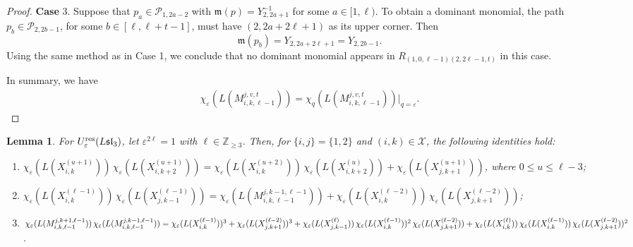 \documentclass[11pt, reqno]{amsart}
\theoremstyle{plain}
\newtheorem{lemma}[theorem]{Lemma}
\theoremstyle{definition}
\numberwithin{equation}{section}
\newcommand{\res}{{\rm res}}
\begin{document}
\begin{proof}
{\bf Case} 3. Suppose that $p_a\in \mathscr{P}_{1,2a-2}$ with $\mathfrak{m}(p)=Y^{-1}_{2,2a+1}$ for some $a\in[1, \ell)$. To obtain a dominant monomial, the path $p_b\in \mathscr{P}_{2,2b-1}$, for some $b\in[\ell,\ell+t-1]$, must have $(2,2a+2\ell+1)$ as its upper corner. Then 
\[
\mathfrak{m}(p_b)=Y_{2,2a+2\ell+1}=Y_{2,2b-1}.
\]
Using the same method as in Case 1, we conclude that no dominant monomial appears in $R_{(1,0,\ell-1)(2,2\ell-1,t)}$ in this case.

In summary, we have
\begin{align*}
\chi_\varepsilon(L(M^{j,v,t}_{i,k,\ell-1}))=\chi_q(L(M^{j,v,t}_{i,k,\ell-1}))|_{q=\varepsilon}.
\end{align*}
\end{proof}  

\begin{lemma}\label{Lem:exchange relations}
For $U_{\varepsilon}^{\res}(L\mathfrak{sl}_3)$, let $\varepsilon^{2\ell} = 1$ with $\ell \in \mathbb{Z}_{\ge 3}$. Then, for $\{i,j\} = \{1,2\}$ and $(i,k) \in \mathcal{X}$, the following identities hold:
{\small
\begin{enumerate}
\item $\chi_\varepsilon(L(X^{(u+1)}_{i,k}))\,\chi_\varepsilon(L(X^{(u+1)}_{i,k+2}))=
\chi_\varepsilon(L(X^{(u+2)}_{i,k}))\,\chi_\varepsilon(L(X^{(u)}_{i,k+2}))+\chi_\varepsilon(L(X^{(u+1)}_{j,k+1}))$, \textit{ where } $0\leq u \leq \ell-3$;

\item $\chi_\varepsilon(L(X^{(\ell-1)}_{i,k}))\,\chi_\varepsilon(L(X^{(\ell-1)}_{j,k-1}))=\chi_\varepsilon(L(M^{j,k-1,\ell-1}_{i,k,\ell-1}))
+\chi_\varepsilon(L(X^{(\ell-2)}_{i,k}))\,\chi_\varepsilon(L(X^{(\ell-2)}_{j,k+1}))$; 

\item $\chi_\varepsilon(L(M^{j,k+1,\ell-1}_{i,k,\ell-1}))\,\chi_\varepsilon(L(M^{j,k-1,\ell-1}_{i,k,\ell-1}))
=\chi_\varepsilon(L(X^{(\ell-1)}_{i,k}))^3+\chi_\varepsilon(L(X^{(\ell-2)}_{j,k+1}))^3\\ +\chi_\varepsilon(L(X^{(\ell)}_{j,k-1}))\, \chi_\varepsilon(L(X^{(\ell-1)}_{i,k}))^2\,\chi_\varepsilon(L(X^{(\ell-2)}_{j,k+1}))
+\chi_\varepsilon(L(X^{(\ell)}_{i,k}))\,\chi_\varepsilon(L(X^{(\ell-1)}_{i,k}))\,\chi_\varepsilon(L(X^{(\ell-2)}_{j,k+1}))^2$.
\end{enumerate}}
\end{lemma}
\end{document}
